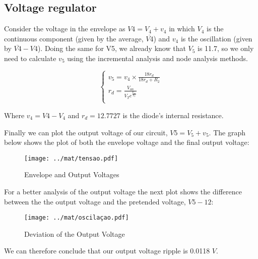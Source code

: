 \subsection{Voltage regulator}
Consider the voltage in the envelope as $V4=V_4 + v_4$ in which $V_4$ is the continuous component (given by the average, $\overline{V4}$) and $v_4$ is the oscillation (given by $\overline{V4} - V4$).
Doing the same for V5, we already know that $V_5$ is 11.7, so we only need to calculate $v_5$ using the incremental analysis and node analysis methods.

\begin{equation}\label{eq:v_2}
\begin{cases}
v_5=v_4\times \frac{18 r_d}{18 r_d + R_2} \\
r_d=\frac{V_{on}}{V_T e^{\frac{V_{on}}{V_T}}}\\
\end{cases}
\end{equation}

Where $v_4= V4 - V_4$ and $r_d=12.7727$ is the diode's internal resistance.
\par
Finally we can plot the output voltage of our circuit, $V5=V_5 + v_5$. The graph below shows the plot of both the envelope voltage and the final output voltage:

\begin{figure}[H] \centering
\texttt{[image: ../mat/tensao.pdf]}
\caption{Envelope and Output Voltages}
\label{fig:tensaoF}
\end{figure}

For a better analysis of the output voltage the next plot shows the difference between the the output voltage and the pretended voltage, $V5-12$:

\begin{figure}[H] \centering
\texttt{[image: ../mat/oscilaçao.pdf]}
\caption{Deviation of the Output Voltage}
\label{fig:desvio}
\end{figure}

We can therefore conclude that our output voltage ripple is 0.0118 $V$.



